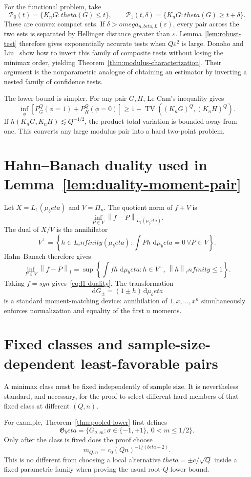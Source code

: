 \documentclass[11pt]{article}
\def\beta{beta}%
\def\theta{theta}%
\def\omega{omega}%
\def\sgn{sgn}%
\def\infty{infinity}%
\newcommand{\sgn}{\operatorname{sgn}}
\newcommand{\TV}{\operatorname{TV}}
\newcommand{\eps}{\varepsilon}
\newcommand{\norm}[1]{\left\lVert#1\right\rVert}
\newcommand{\dd}{\,\mathrm d}
\begin{document}
For the functional problem, take
\[
\mathcal P_0(t)
=\{K_nG:\theta(G)\le t\},
\qquad
\mathcal P_1(t,\delta)
=\{K_nG:\theta(G)\ge t+\delta\}.
\]
These are convex compact sets.  If $\delta>\omega_{n,\beta,L}(\eps)$, every pair across the two sets is separated by Hellinger distance greater than $\eps$.  Lemma~\ref{lem:robust-test} therefore gives exponentially accurate tests when $Q\eps^2$ is large.  Donoho and Liu~\cite{DonohoLiuII} show how to invert this family of composite tests without losing the minimax order, yielding Theorem~\ref{thm:modulus-characterization}.  Their argument is the nonparametric analogue of obtaining an estimator by inverting a nested family of confidence tests.

The lower bound is simpler.  For any pair $G,H$, Le Cam's inequality gives
\[
\inf_\phi\left[
P_G^Q(\phi=1)+P_H^Q(\phi=0)
\right]
\ge1-\TV((K_nG)^Q,(K_nH)^Q).
\]
If $h(K_nG,K_nH)\lesssim Q^{-1/2}$, the product total variation is bounded away from one.  This converts any large modulus pair into a hard two-point problem.

\section{Hahn--Banach duality used in Lemma~\ref{lem:duality-moment-pair}}

Let $X=L_1(\mu_\beta)$ and $V=\Pi_n$.  The quotient norm of $f+V$ is
\[
\inf_{P\in V}\norm{f-P}_{L_1(\mu_\beta)}.
\]
The dual of $X/V$ is the annihilator
\[
V^\perp
=
\left\{h\in L_\infty(\mu_\beta):
\int Ph\,\dd\mu_\beta=0\ \forall P\in V
\right\}.
\]
Hahn--Banach therefore gives
\[
\inf_{P\in V}\norm{f-P}_1
=
\sup\left\{
\int fh\,\dd\mu_\beta:
 h\in V^\perp,\ \norm h_\infty\le1
\right\}.
\]
Taking $f=\sgn$ gives~\eqref{eq:l1-duality}.  The transformation
\[
\dd G_\pm=(1\pm h)\dd\mu_\beta
\]
is a standard moment-matching device: annihilation of $1,x,\dots,x^n$ simultaneously enforces normalization and equality of the first $n$ moments.

\section{Fixed classes and sample-size-dependent least-favorable pairs}

A minimax class must be fixed independently of sample size.  It is nevertheless standard, and necessary, for the proof to select different hard members of that fixed class at different $(Q,n)$.

For example, Theorem~\ref{thm:pooled-lower} first defines
\[
\mathfrak G_\beta
=\{G_{\sigma,m}:\sigma\in\{-1,+1\},\ 0<m\le 1/2\}.
\]
Only after the class is fixed does the proof choose
\[
m_{Q,n}=c_0(Qn)^{-1/(\beta+2)}.
\]
This is no different from choosing a local alternative $\theta=\pm c/\sqrt Q$ inside a fixed parametric family when proving the usual root-$Q$ lower bound.
\end{document}
